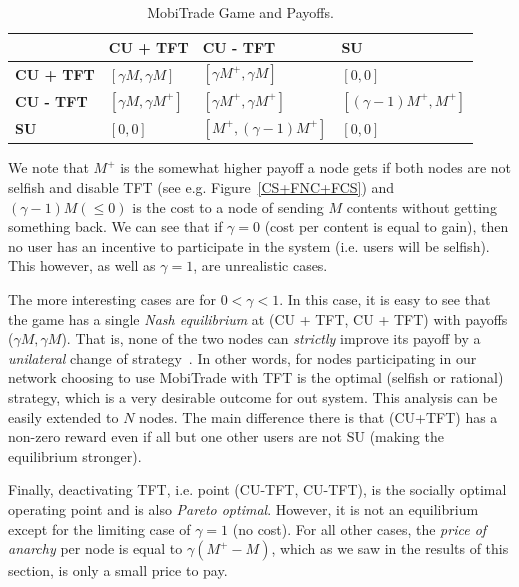 \begin{table}[!h]
\vspace{-0.1in}
\caption{MobiTrade Game and Payoffs.}
\centering
\label{table:game}
\footnotesize
\begin{tabular}{|p{2cm}|p{2cm}|p{3cm}|p{3cm}|}
\hline
\bfseries & \bfseries CU + TFT & \bfseries CU - TFT  & \bfseries SU\\
\hline
\bfseries CU + TFT & $[\gamma M, \gamma M]$ & $[\gamma M^{+}, \gamma M]$ & $[0,0]$\\
\hline
\bfseries CU - TFT & $[\gamma M, \gamma M^{+}]$ & $[\gamma M^{+}, \gamma M^{+}]$ &$[(\gamma - 1) M^{+}, M^{+} ]$ \\
\hline
\bfseries SU &$[0, 0]$ &$[ M^{+}, (\gamma - 1) M^{+}]$ & $[0, 0]$\\
\hline
\end{tabular}
\end{table}

We note that $M^{+}$ is the somewhat higher payoff a node gets if both nodes are not selfish and disable TFT (see e.g. Figure~\ref{CS+FNC+FCS}) and $(\gamma - 1)M (\le 0)$ is the cost to a node of sending $M$ contents without getting something back. We can see that if $\gamma = 0$ (cost per content is equal to gain), then no user has an incentive to participate in the system (i.e. users will be selfish). This however, as well as $\gamma = 1$, are unrealistic cases.

The more interesting cases are for $0 < \gamma < 1$. In this case, it is easy to see that the game has a single \emph{Nash equilibrium} at (CU + TFT, CU + TFT) with payoffs ($\gamma M, \gamma M$). That is, none of the two nodes can \emph{strictly} improve its payoff by a \emph{unilateral} change of strategy~\cite{game}. In other words, for nodes participating in our network choosing to use MobiTrade with TFT is the optimal (selfish or rational) strategy, which is a very desirable outcome for out system. This analysis can be easily extended to $N$ nodes. The main difference there is that (CU+TFT) has a non-zero reward even if all but one other users are not SU (making the equilibrium stronger).

Finally, deactivating TFT, i.e. point (CU-TFT, CU-TFT), is the socially optimal operating point and is also \emph{Pareto optimal}. However, it is not an equilibrium except for the limiting case of $\gamma = 1$ (no cost). For all other cases, the \emph{price of anarchy} per node is equal to $\gamma (M^{+} - M)$, which as we saw in the results of this section, is only a small price to pay.

